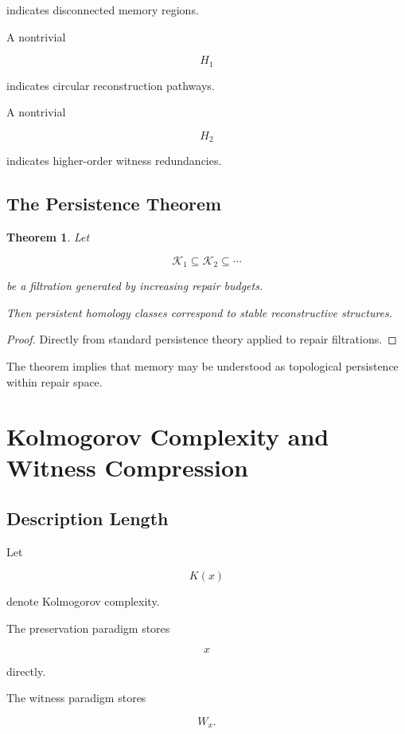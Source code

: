 \documentclass[12pt,oneside]{book}
\theoremstyle{plain} \newtheorem{theorem}{Theorem}[chapter] \newtheorem{lemma}[theorem]{Lemma} \newtheorem{proposition}[theorem]{Proposition} \newtheorem{corollary}[theorem]{Corollary}
\theoremstyle{definition} \newtheorem{definition}[theorem]{Definition} \newtheorem{axiom}[theorem]{Axiom} \newtheorem{construction}[theorem]{Construction}
\theoremstyle{remark} \newtheorem{remark}[theorem]{Remark} \newtheorem{example}[theorem]{Example}
\begin{document}
indicates disconnected memory regions.

A nontrivial

\[
H_1
\]

indicates circular reconstruction pathways.

A nontrivial

\[
H_2
\]

indicates higher-order witness redundancies.

\section{The Persistence Theorem}

\begin{theorem}

Let

\[
\mathcal K_1
\subseteq
\mathcal K_2
\subseteq
\cdots
\]

be a filtration generated by increasing repair budgets.

Then persistent homology classes correspond to stable reconstructive structures.

\end{theorem}

\begin{proof}

Directly from standard persistence theory applied to repair filtrations.

\end{proof}

The theorem implies that memory may be understood as topological persistence within repair space.

\chapter{Kolmogorov Complexity and Witness Compression}

\section{Description Length}

Let

\[
K(x)
\]

denote Kolmogorov complexity.

The preservation paradigm stores

\[
x
\]

directly.

The witness paradigm stores

\[
W_x.
\]
\end{document}
